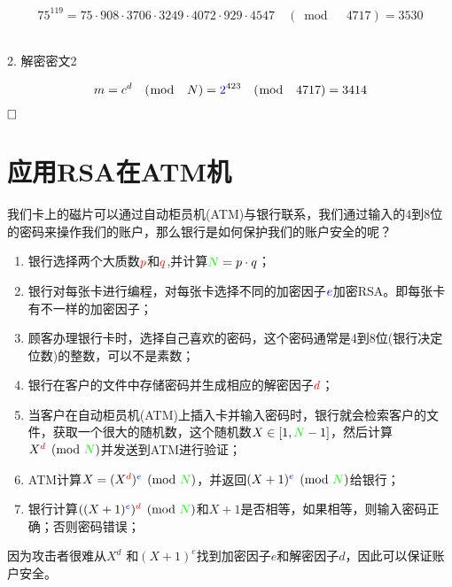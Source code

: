 \documentclass{article}
\begin{document}
$$75^{119} = 75\cdot908\cdot3706\cdot3249\cdot4072\cdot929\cdot4547 \quad (\bmod \quad 4717)  = 3530$$

~\\

2. 解密密文{\color{blue}2}

$$m = c^d \quad (\bmod \quad N) = {\color{blue}2}^{423} \quad (\bmod \quad 4717) = 3414$$

$\hfill\square$ 

\section{应用RSA在ATM机}

我们卡上的磁片可以通过自动柜员机(ATM)与银行联系，我们通过输入的4到8位的密码来操作我们的账户，那么银行是如何保护我们的账户安全的呢？
\begin{enumerate}
\item 银行选择两个大质数${\color{red}p}$和${\color{red}q}$,并计算${\color{green}N} = p \cdot q$；
\item 银行对每张卡进行编程，对每张卡选择不同的加密因子${\color{blue}e}$加密RSA。即每张卡有不一样的加密因子；
\item 顾客办理银行卡时，选择自己喜欢的密码，这个密码通常是4到8位(银行决定位数)的整数，可以不是素数；
\item 银行在客户的文件中存储密码并生成相应的解密因子${\color{red}d}$；
\item 当客户在自动柜员机(ATM)上插入卡并输入密码时，银行就会检索客户的文件，获取一个很大的随机数，这个随机数$X \in [1,{\color{green}N}-1]$，然后计算$X^{\color{red}d} \pmod{{\color{green}N}}$并发送到ATM进行验证；
\item ATM计算$X = (X^{\color{red}d})^{{\color{blue}e}} \pmod{{\color{green}N}}$，并返回$(X+1)^{{\color{blue}e}} \pmod{{\color{green}N}}$给银行；
\item 银行计算$((X+1)^{{\color{blue}e}})^{{\color{red}d}} \pmod{{\color{green}N}}$和$X+1$是否相等，如果相等，则输入密码正确；否则密码错误；
\end{enumerate}

因为攻击者很难从$X^d$ 和$(X+1)^e$找到加密因子$e$和解密因子$d$，因此可以保证账户安全。
\end{document}
